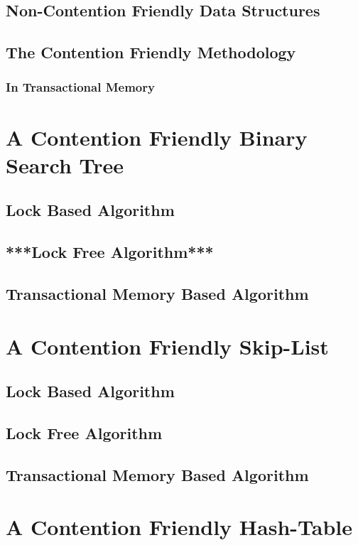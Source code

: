 \documentclass[11pt]{book}
\begin{document}
\section{Non-Contention Friendly Data Structures}
\section{The Contention Friendly Methodology}
\subsection{In Transactional Memory}


\chapter{A Contention Friendly Binary Search Tree}
\label{chap:scheduling}
%
\section{Lock Based Algorithm}
\section{***Lock Free Algorithm***}
\section{Transactional Memory Based Algorithm}


\chapter{A Contention Friendly Skip-List}
\label{chap:scheduling}
\section{Lock Based Algorithm}
\section{Lock Free Algorithm}
\section{Transactional Memory Based Algorithm}


\chapter{A Contention Friendly Hash-Table}
\label{chap:scheduling}
\end{document}
